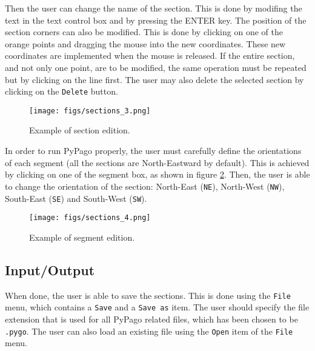 Then the user can
change the name of the section. This is done by modifing the text in
the text control box and by pressing the ENTER key. 
The position of the section corners can also be modified. This is
done by clicking on one of the orange points and dragging the mouse
into the new coordinates. These new coordinates are implemented when
the mouse is released. If the entire section, and not only one point,
are to be modified, the same operation must be repeated but by clicking
on the line first.
The user may also delete the selected section by clicking on the
\verb+Delete+ button.\\

\begin{figure}[h!]
\centering
\texttt{[image: figs/sections\_3.png]}
\caption{Example of section edition.}
\label{fig:sections_3}
\end{figure}

In order to run PyPago properly, the user must carefully define the
orientations of each segment (all the sections are North-Eastward by default). This is achieved by clicking on one of
the segment box, as shown in figure \ref{fig:sections_4}. Then, the
user is able to change the orientation of the section: North-East
(\verb+NE+), North-West (\verb+NW+), South-East (\verb+SE+) and South-West (\verb+SW+).\\

\begin{figure}[h!]
\centering
\texttt{[image: figs/sections\_4.png]}
\caption{Example of segment edition.}
\label{fig:sections_4}
\end{figure}

\subsection{Input/Output}

When done, the user is able to save the sections.  This is done using
the \verb+File+ menu, which contains a \verb+Save+ and a \verb+Save as+
item. The user should specify the file extension that is used for all
PyPago related files, which has been chosen to be \verb+.pygo+. The
user can also load an existing file using the \verb+Open+ item of the
\verb+File+ menu.
